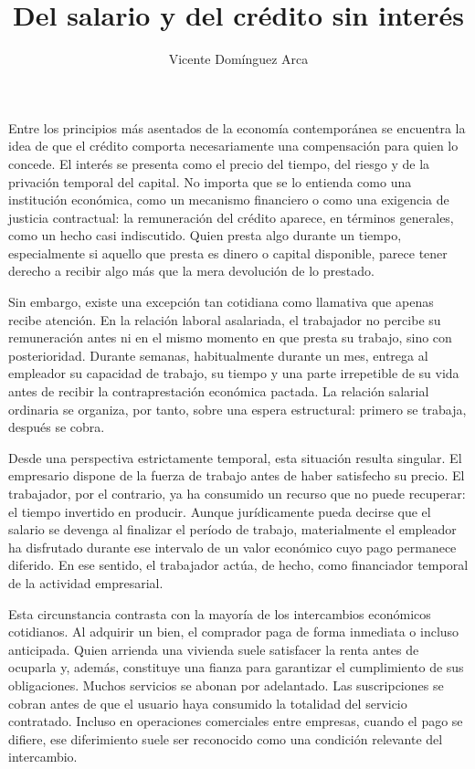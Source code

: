 \documentclass[12pt,a4paper]{article}
\title{Del salario y del crédito sin interés}
\author{Vicente Domínguez Arca}
\date{}
\begin{document}
\maketitle

Entre los principios más asentados de la economía contemporánea se encuentra la idea de que el crédito comporta necesariamente una compensación para quien lo concede. El interés se presenta como el precio del tiempo, del riesgo y de la privación temporal del capital. No importa que se lo entienda como una institución económica, como un mecanismo financiero o como una exigencia de justicia contractual: la remuneración del crédito aparece, en términos generales, como un hecho casi indiscutido. Quien presta algo durante un tiempo, especialmente si aquello que presta es dinero o capital disponible, parece tener derecho a recibir algo más que la mera devolución de lo prestado.

Sin embargo, existe una excepción tan cotidiana como llamativa que apenas recibe atención. En la relación laboral asalariada, el trabajador no percibe su remuneración antes ni en el mismo momento en que presta su trabajo, sino con posterioridad. Durante semanas, habitualmente durante un mes, entrega al empleador su capacidad de trabajo, su tiempo y una parte irrepetible de su vida antes de recibir la contraprestación económica pactada. La relación salarial ordinaria se organiza, por tanto, sobre una espera estructural: primero se trabaja, después se cobra.

Desde una perspectiva estrictamente temporal, esta situación resulta singular. El empresario dispone de la fuerza de trabajo antes de haber satisfecho su precio. El trabajador, por el contrario, ya ha consumido un recurso que no puede recuperar: el tiempo invertido en producir. Aunque jurídicamente pueda decirse que el salario se devenga al finalizar el período de trabajo, materialmente el empleador ha disfrutado durante ese intervalo de un valor económico cuyo pago permanece diferido. En ese sentido, el trabajador actúa, de hecho, como financiador temporal de la actividad empresarial.

Esta circunstancia contrasta con la mayoría de los intercambios económicos cotidianos. Al adquirir un bien, el comprador paga de forma inmediata o incluso anticipada. Quien arrienda una vivienda suele satisfacer la renta antes de ocuparla y, además, constituye una fianza para garantizar el cumplimiento de sus obligaciones. Muchos servicios se abonan por adelantado. Las suscripciones se cobran antes de que el usuario haya consumido la totalidad del servicio contratado. Incluso en operaciones comerciales entre empresas, cuando el pago se difiere, ese diferimiento suele ser reconocido como una condición relevante del intercambio.
\end{document}
